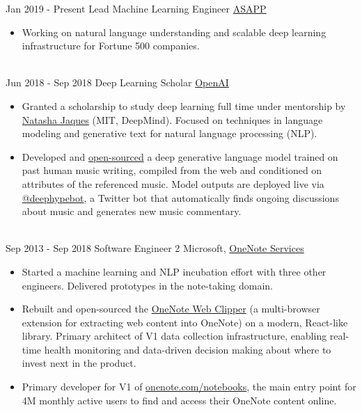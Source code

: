 \documentclass[letterpaper]{twentysecondcv} %
\begin{document}
\begin{twenty} %
    \twentyitem
    	{Jan 2019 -}
		{Present}
        {Lead Machine Learning Engineer}
        {\href{https://www.asapp.com/}{ASAPP}}
        {}
        {
        {\begin{itemize} \itemsep -2pt %
        \item Working on natural language understanding and scalable deep learning infrastructure for Fortune 500 companies.
        \end{itemize}}
        }
    \\
    \twentyitem
    	{Jun 2018 -}
		{Sep 2018}
        {Deep Learning Scholar}
        {\href{https://blog.openai.com/openai-scholars/}{OpenAI}}
        {}
        {
        {\begin{itemize} \itemsep -2pt %
        \item Granted a scholarship to study deep learning full time under mentorship by \href{https://www.linkedin.com/in/natashajaques}{Natasha Jaques} (MIT, DeepMind). Focused on techniques in language modeling and generative text for natural language processing (NLP).
        \item Developed and \href{https://github.com/iconix/deephypebot}{open-sourced} a deep generative language model trained on past human music writing, compiled from the web and conditioned on attributes of the referenced music. Model outputs are deployed live via \href{https://twitter.com/deephypebot}{@deephypebot}, a Twitter bot that automatically finds ongoing discussions about music and generates new music commentary.
        \end{itemize}}
        }
    \\
    \twentyitem
    	{Sep 2013 -}
		{Sep 2018}
        {Software Engineer 2}
        {Microsoft, \href{http://www.onenote.com/}{OneNote Services}}
        {}
        {
        {\begin{itemize} \itemsep -2pt %
        \item Started a machine learning and NLP incubation effort with three other engineers. Delivered prototypes in the note-taking domain.
        \item Rebuilt and open-sourced the \href{https://github.com/OneNoteDev/WebClipper}{OneNote Web Clipper} (a multi-browser extension for extracting web content into OneNote) on a modern, React-like library. Primary architect of V1 data collection infrastructure, enabling real-time health monitoring and data-driven decision making about where to invest next in the product.
        \item Primary developer for V1 of \href{https://www.onenote.com/notebooks}{onenote.com/notebooks}, the main entry point for 4M monthly active users to find and access their OneNote content online.
        \end{itemize}}
        }

\end{twenty}
\end{document}

